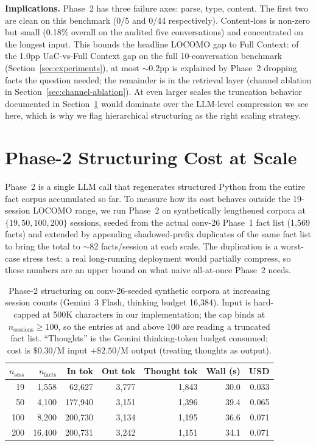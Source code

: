 \textbf{Implications.} Phase~2 has three failure axes: parse, type, content. The first two are clean on this benchmark (0/5 and 0/44 respectively). Content-loss is non-zero but small (0.18\% overall on the audited five conversations) and concentrated on the longest input. This bounds the headline LOCOMO gap to Full Context: of the 1.0pp UaC-vs-Full Context gap on the full 10-conversation benchmark (Section~\ref{sec:experiments}), at most $\sim$0.2pp is explained by Phase~2 dropping facts the question needed; the remainder is in the retrieval layer (channel ablation in Section~\ref{sec:channel-ablation}). At even larger scales the truncation behavior documented in Section~\ref{sec:phase2-scalability} would dominate over the LLM-level compression we see here, which is why we flag hierarchical structuring as the right scaling strategy.


\section{Phase-2 Structuring Cost at Scale}
\label{sec:phase2-scalability}

Phase~2 is a single LLM call that regenerates structured Python from the entire fact corpus accumulated so far. To measure how its cost behaves outside the 19-session LOCOMO range, we run Phase~2 on synthetically lengthened corpora at $\{19, 50, 100, 200\}$ sessions, seeded from the actual conv-26 Phase~1 fact list (1{,}569 facts) and extended by appending shadowed-prefix duplicates of the same fact list to bring the total to $\sim$82 facts/session at each scale. The duplication is a worst-case stress test: a real long-running deployment would partially compress, so these numbers are an upper bound on what naive all-at-once Phase~2 needs.

\begin{table}[!ht]
\centering
\caption{Phase-2 structuring on conv-26-seeded synthetic corpora at increasing session counts (Gemini~3 Flash, thinking budget 16{,}384). Input is hard-capped at 500K characters in our implementation; the cap binds at $n_{\text{sessions}} \geq 100$, so the entries at and above 100 are reading a truncated fact list. ``Thoughts'' is the Gemini thinking-token budget consumed; cost is $\$0.30$/M input $+ \$2.50$/M output (treating thoughts as output).}
\label{tab:phase2-scalability}
\small
\begin{tabular}{@{}rrrrrrr@{}}
\toprule
$n_{\text{sess}}$ & $n_{\text{facts}}$ & In tok & Out tok & Thought tok & Wall (s) & USD \\
\midrule
 19 & 1{,}558  & 62{,}627 & 3{,}777 & 1{,}843 & 30.0 & 0.033 \\
 50 & 4{,}100  & 177{,}940 & 3{,}151 & 1{,}396 & 39.4 & 0.065 \\
100 & 8{,}200  & 200{,}730 & 3{,}134 & 1{,}195 & 36.6 & 0.071 \\
200 & 16{,}400 & 200{,}731 & 3{,}242 & 1{,}151 & 34.1 & 0.071 \\
\bottomrule
\end{tabular}
\end{table}

